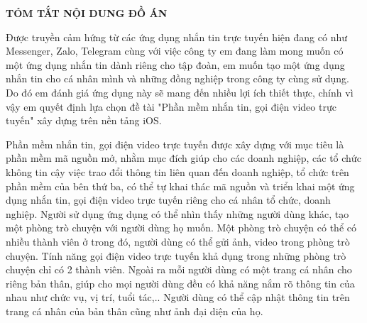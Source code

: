 \documentclass[../DoAn.tex]{subfiles}
\begin{document}
\begin{center}
    \Large{\textbf{TÓM TẮT NỘI DUNG ĐỒ ÁN}}\\
\end{center}
\vspace{1cm}
Được truyền cảm hứng từ các ứng dụng nhắn tin trực tuyến hiện đang có như Messenger, Zalo, Telegram cùng với việc công ty em đang làm mong muốn có một ứng dụng nhắn tin dành riêng cho tập đoàn, em muốn tạo một ứng dụng nhắn tin cho cá nhân mình và những đồng nghiệp trong công ty cùng sử dụng. Do đó em đánh giá ứng dụng này sẽ mang đến nhiều lợi ích thiết thực, chính vì vậy em quyết định lựa chọn đề tài "Phần mềm nhắn tin, gọi điện video trực tuyến" xây dựng trên nền tảng iOS.

Phần mềm nhắn tin, gọi điện video trực tuyến được xây dựng với mục tiêu là phần mềm mã nguồn mở, nhằm mục đích giúp cho các doanh nghiệp, các tổ chức không tin cậy việc trao đổi thông tin liên quan đến doanh nghiệp, tổ chức trên phần mềm của bên thứ ba, có thể tự khai thác mã nguồn và triển khai một ứng dụng nhắn tin, gọi điện video trực tuyến riêng cho cá nhân tổ chức, doanh nghiệp. Người sử dụng ứng dụng có thể nhìn thấy những người dùng khác, tạo một phòng trò chuyện với người dùng họ muốn. Một phòng trò chuyện có thể có nhiều thành viên ở trong đó, người dùng có thể gửi ảnh, video trong phòng trò chuyện. Tính năng gọi điện video trực tuyến khả dụng trong những phòng trò chuyện chỉ có 2 thành viên. Ngoài ra mỗi người dùng có một trang cá nhân cho riêng bản thân, giúp cho mọi người dùng đều có khả năng nắm rõ thông tin của nhau như chức vụ, vị trí, tuổi tác,.. Người dùng có thể cập nhật thông tin trên trang cá nhân của bản thân cũng như ảnh đại diện của họ.
\end{document}
